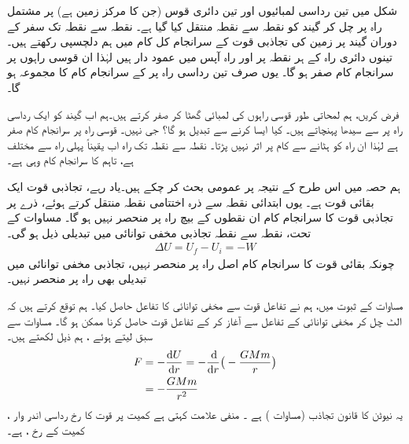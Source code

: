 شکل  میں    تین رداسی لمبائیوں اور تین دائری قوس  (جن کا مرکز زمین ہے) پر   مشتمل  راہ پر چل کر  گیند  کو نقطہ  سے نقطہ   منتقل کیا گیا ہے۔ نقطہ  سے نقطہ  تک  سفر کے دوران گیند پر زمین کی تجاذبی قوت   کے سرانجام کل  کام   میں ہم دلچسپی رکھتے ہیں۔تینوں    دائری راہ  کے ہر نقطہ پر  اور  راہ  آپس میں عمود دار ہیں لہٰذا ان قوسی راہوں پر سرانجام  کام صفر ہو گا۔ یوں  صرف تین  رداسی راہ پر   کے سرانجام کام کا مجموعہ ہو گا۔

فرض کریں، ہم لمحاتی طور  قوسی  راہوں  کی لمبائی گھٹا کر صفر کرتے ہیں۔ہم اب گیند کو ایک رداسی راہ پر  سے سیدھا  پہنچاتے ہیں۔ کیا ایسا کرنے سے  تبدیل ہو گا؟ جی نہیں۔ قوسی راہ پر سرانجام کام صفر ہے لہٰذا  ان راہ کو ہٹانے سے کام پر اثر نہیں پڑتا۔ نقطہ  سے نقطہ  تک راہ اب یقیناً پہلی راہ سے مختلف ہے، تاہم  کا سرانجام کام وہی ہے۔

ہم  حصہ  میں اس طرح کے نتیجہ  پر عمومی بحث کر چکے ہیں۔یاد رہے، تجاذبی قوت    ایک بقائی  قوت ہے۔ یوں ابتدائی نقطہ  سے ذرہ  اختتامی نقطہ  منتقل کرتے ہوئے، ذرے پر تجاذبی قوت کا سرانجام کام ان نقطوں کے بیچ راہ پر منحصر نہیں ہو گا۔ مساوات  کے تحت، نقطہ  سے نقطہ   تجاذبی مخفی توانائی میں تبدیلی  ذیل ہو گی۔
\begin{align}
\Delta U=U_f-U_i=-W
\end{align}
چونکہ بقائی قوت  کا سرانجام کام   اصل راہ پر منحصر نہیں،  تجاذبی مخفی توانائی میں تبدیلی  بھی راہ پر منحصر نہیں۔

مساوات  کے  ثبوت  میں،   ہم نے تفاعل قوت  سے مخفی توانائی کا تفاعل  حاصل کیا۔ ہم توقع کرتے ہیں کہ  الٹ چل کر مخفی توانائی کے تفاعل سے آغاز کر کے  تفاعل قوت  حاصل  کرنا ممکن ہو گا۔ مساوات    سے سبق  لیتے ہوئے ، ہم ذیل لکھتے ہیں۔
\begin{gather}
\begin{aligned}
F&=-\frac{\dif U}{\dif r}=-\frac{\dif}{\dif r}\big(-\frac{GMm}{r}\big)\\
&=-\frac{GMm}{r^2}
\end{aligned}
\end{gather}
یہ نیوٹن کا قانون تجاذب (مساوات ) ہے ۔ منفی علامت کہتی ہے کمیت  پر قوت کا رخ رداسی اندر وار  ، کمیت  کے رخ  ، ہے۔

